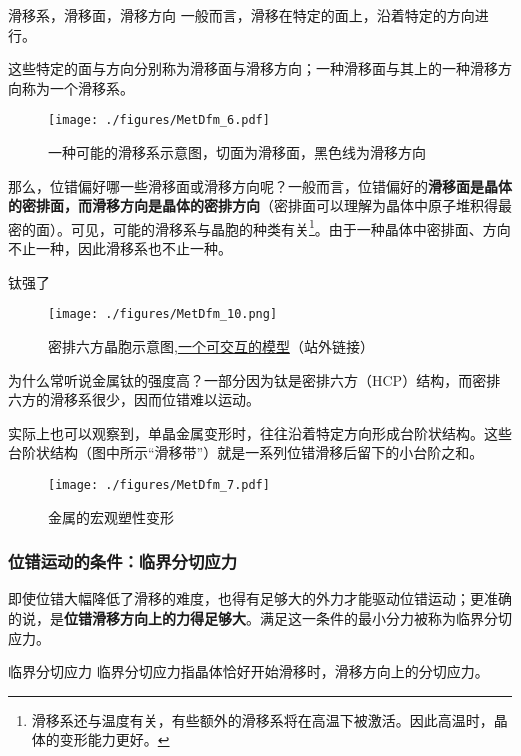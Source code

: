 \begin{theorem}{滑移系，滑移面，滑移方向}
一般而言，滑移在特定的面上，沿着特定的方向进行。

这些特定的面与方向分别称为滑移面与滑移方向；一种滑移面与其上的一种滑移方向称为一个滑移系。

\end{theorem}
\begin{figure}[ht]
\centering
\texttt{[image: ./figures/MetDfm\_6.pdf]}
\caption{一种可能的滑移系示意图，切面为滑移面，黑色线为滑移方向} \label{MetDfm_fig6}
\end{figure}

那么，位错偏好哪一些滑移面或滑移方向呢？一般而言，位错偏好的\textbf{滑移面是晶体的密排面，而滑移方向是晶体的密排方向}（密排面可以理解为晶体中原子堆积得最密的面）。可见，可能的滑移系与晶胞的种类有关\footnote{滑移系还与温度有关，有些额外的滑移系将在高温下被激活。因此高温时，晶体的变形能力更好。}。由于一种晶体中密排面、方向不止一种，因此滑移系也不止一种。

\begin{example}{钛强了}
\begin{figure}[ht]
\centering
\texttt{[image: ./figures/MetDfm\_10.png]}
\caption{密排六方晶胞示意图,\href{https://www.geogebra.org/m/xrzejabt}{一个可交互的模型}（站外链接）} \label{MetDfm_fig10}
\end{figure}
为什么常听说金属钛的强度高？一部分因为钛是密排六方（HCP）结构，而密排六方的滑移系很少，因而位错难以运动。
\end{example}

实际上也可以观察到，单晶金属变形时，往往沿着特定方向形成台阶状结构。这些台阶状结构（图中所示“滑移带”）就是一系列位错滑移后留下的小台阶之和。
\begin{figure}[ht]
\centering
\texttt{[image: ./figures/MetDfm\_7.pdf]}
\caption{金属的宏观塑性变形} \label{MetDfm_fig7}
\end{figure}

\subsubsection{位错运动的条件：临界分切应力}
即使位错大幅降低了滑移的难度，也得有足够大的外力才能驱动位错运动；更准确的说，是\textbf{位错滑移方向上的力得足够大}。满足这一条件的最小分力被称为临界分切应力。

\begin{definition}{临界分切应力}
临界分切应力指晶体恰好开始滑移时，滑移方向上的分切应力。
\end{definition}

